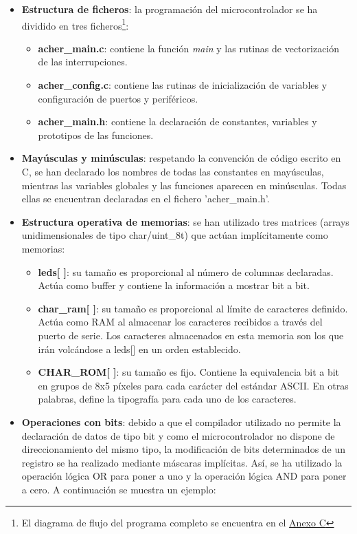 \begin{itemize}
  \item{\textbf{Estructura de ficheros}: la programación del microcontrolador se ha dividido en tres ficheros\footnote{El diagrama de flujo del programa completo se encuentra en el \hyperref[anexoc]{Anexo C}}:
    \begin{itemize}
      \item{\textbf{acher\_main.c}: contiene la función \textit{main} y las rutinas de vectorización de las interrupciones.}
      \item{\textbf{acher\_config.c}: contiene las rutinas de inicialización de variables y configuración de puertos y periféricos.}
      \item{\textbf{acher\_main.h}: contiene la declaración de constantes, variables y prototipos de las funciones.}
    \end{itemize}}
  \item{\textbf{Mayúsculas y minúsculas}: respetando la convención de código escrito en C, se han declarado los nombres de todas las constantes en mayúsculas, mientras las variables globales y las funciones aparecen en minúsculas. Todas ellas se encuentran declaradas en el fichero 'acher\_main.h'.}
  \item{\textbf{Estructura operativa de memorias}: se han utilizado tres matrices (arrays unidimensionales de tipo char/uint\_8t) que actúan implícitamente como memorias:
    \begin{itemize}
      \item{\textbf{leds[ ]}: su tamaño es proporcional al número de columnas declaradas. Actúa como buffer y contiene la información a mostrar bit a bit.}
      \item{\textbf{char\_ram[ ]}: su tamaño es proporcional al límite de caracteres definido. Actúa como RAM al almacenar los caracteres recibidos a través del puerto de serie. Los caracteres almacenados en esta memoria son los que irán volcándose a leds[] en un orden establecido.}
      \item{\textbf{CHAR\_ROM[ ]}: su tamaño es fijo. Contiene la equivalencia bit a bit en grupos de 8x5 píxeles para cada carácter del estándar ASCII. En otras palabras, define la tipografía para cada uno de los caracteres.}
    \end{itemize}}
  \item{\textbf{Operaciones con bits}: debido a que el compilador utilizado no permite la declaración de datos de tipo bit y como el microcontrolador no dispone de direccionamiento del mismo tipo, la modificación de bits determinados de un registro se ha realizado mediante máscaras implícitas. Así, se ha utilizado la operación lógica OR para poner a uno y la operación lógica AND para poner a cero. A continuación se muestra un ejemplo:

}
\end{itemize}
